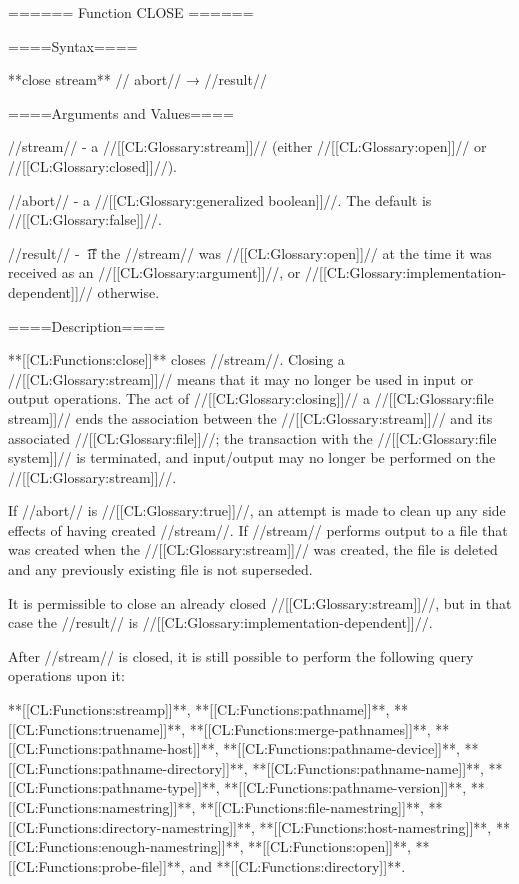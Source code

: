 ====== Function CLOSE ======

====Syntax====

**close {stream** //\key} abort// → //result//

====Arguments and Values====

//stream// - a //[[CL:Glossary:stream]]// (either //[[CL:Glossary:open]]// or //[[CL:Glossary:closed]]//).

//abort// - a //[[CL:Glossary:generalized boolean]]//. The default is //[[CL:Glossary:false]]//.

//result// - \t\ if the //stream// was //[[CL:Glossary:open]]// at the time it was received as an //[[CL:Glossary:argument]]//, or //[[CL:Glossary:implementation-dependent]]// otherwise.

====Description====

**[[CL:Functions:close]]** closes //stream//. Closing a //[[CL:Glossary:stream]]// means that it may no longer be used in input or output operations. The act of //[[CL:Glossary:closing]]// a //[[CL:Glossary:file stream]]// ends the association between the //[[CL:Glossary:stream]]// and its associated //[[CL:Glossary:file]]//; the transaction with the //[[CL:Glossary:file system]]// is terminated, and input/output may no longer be performed on the //[[CL:Glossary:stream]]//.

If //abort// is //[[CL:Glossary:true]]//, an attempt is made to clean up any side effects of having created //stream//. If //stream// performs output to a file that was created when the //[[CL:Glossary:stream]]// was created, the file is deleted and any previously existing file is not superseded.

It is permissible to close an already closed //[[CL:Glossary:stream]]//, but in that case the //result// is //[[CL:Glossary:implementation-dependent]]//.

After //stream// is closed, it is still possible to perform the following query operations upon it:

**[[CL:Functions:streamp]]**, **[[CL:Functions:pathname]]**, **[[CL:Functions:truename]]**, **[[CL:Functions:merge-pathnames]]**, **[[CL:Functions:pathname-host]]**, **[[CL:Functions:pathname-device]]**, **[[CL:Functions:pathname-directory]]**, **[[CL:Functions:pathname-name]]**, **[[CL:Functions:pathname-type]]**, **[[CL:Functions:pathname-version]]**, **[[CL:Functions:namestring]]**, **[[CL:Functions:file-namestring]]**, **[[CL:Functions:directory-namestring]]**, **[[CL:Functions:host-namestring]]**, **[[CL:Functions:enough-namestring]]**, **[[CL:Functions:open]]**, **[[CL:Functions:probe-file]]**, and **[[CL:Functions:directory]]**.

